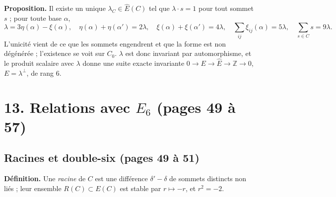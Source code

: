 \documentclass[11pt,a4paper]{article}
\begin{document}
\textbf{Proposition.} Il existe un unique $\lambda_C \in \widehat E(C)$ tel que
$\lambda \cdot s = 1$ pour tout sommet $s$ ; pour toute base $\alpha$,
\[
\lambda = 3\eta(\alpha) - \xi(\alpha), \quad \eta(\alpha) + \eta(\alpha') =
2\lambda, \quad \xi(\alpha) + \xi(\alpha') = 4\lambda, \quad \sum_{ij}
\xi_{ij}(\alpha) = 5\lambda, \quad \sum_{s \in C} s = 9\lambda .
\]
L'unicité vient de ce que les sommets engendrent et que la forme est non
dégénérée ; l'existence se voit sur $C_0$. $\lambda$ est donc invariant par
automorphisme, et le produit scalaire avec $\lambda$ donne une suite exacte
invariante $0 \to E \to \widehat E \to \mathbb{Z} \to 0$, $E = \lambda^\perp$,
de rang 6.

\section*{13. Relations avec $E_6$ (pages 49 à 57)}

\subsection*{Racines et double-six (pages 49 à 51)}

\textbf{Définition.} Une \emph{racine} de $C$ est une différence $\delta' -
\delta$ de sommets distincts non liés ; leur ensemble $R(C) \subset E(C)$ est
stable par $r \mapsto -r$, et $r^2 = -2$.
\end{document}
